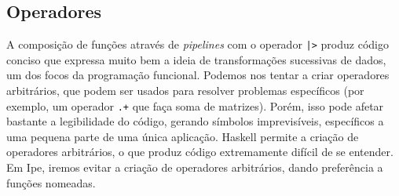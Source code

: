 \subsection{Operadores}

A composição de funções através de \textit{pipelines} com o operador
\texttt{|>} produz código conciso que expressa muito bem a ideia de transformações
sucessivas de dados, um dos focos da programação funcional. Podemos nos tentar
a criar operadores arbitrários, que podem ser usados para resolver problemas
específicos (por exemplo, um operador \texttt{.+} que faça soma de matrizes).
Porém, isso pode afetar bastante a legibilidade do código, gerando símbolos
imprevisíveis, específicos a uma pequena parte de uma única aplicação. Haskell
permite a criação de operadores arbitrários, o que produz código extremamente
difícil de se entender. Em Ipe, iremos evitar a criação de operadores arbitrários,
dando preferência a funções nomeadas.
